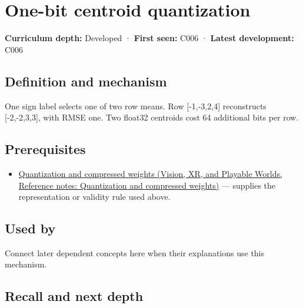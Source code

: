 \hypertarget{appendix-4ccd7a775813}{}\label{referencestart:appendix-4ccd7a775813}
\section{One-bit centroid quantization}\label{appendix-4ccd7a775813-one-bit-centroid-quantization}

\textbf{Curriculum depth:} Developed · \textbf{First seen:} C006 · \textbf{Latest development:} C006

\begin{allmightroledefinition}

\subsection{Definition and mechanism}\label{appendix-4ccd7a775813-definition-and-mechanism}

One sign label selects one of two row means. Row {[}-1,-3,2,4{]} reconstructs {[}-2,-2,3,3{]}, with RMSE one. Two float32 centroids cost 64 additional bits per row.

\end{allmightroledefinition}

\subsection{Prerequisites}\label{appendix-4ccd7a775813-prerequisites}

\begin{itemize}
\tightlist
\item
  \href{../07-Vision-XR-and-Playable-Worlds/main.pdf\#nameddest=appendix-fdc7879e8bf2}{Quantization and compressed weights (Vision, XR, and Playable Worlds, Reference notes: Quantization and compressed weights)} --- supplies the representation or validity rule used above.
\end{itemize}

\subsection{Used by}\label{appendix-4ccd7a775813-used-by}

Connect later dependent concepts here when their explanations use this mechanism.

\subsection{Recall and next depth}\label{appendix-4ccd7a775813-recall-and-next-depth}

